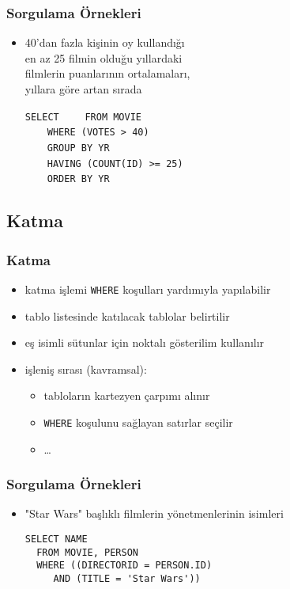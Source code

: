 \documentclass[dvipsnames]{beamer}
\theoremstyle{plain}
\begin{document}
\begin{frame}[fragile]
  \frametitle{Sorgulama Örnekleri}

  \begin{itemize}
    \item 40'dan fazla kişinin oy kullandığı\\
                en az 25 filmin olduğu yıllardaki\\
                filmlerin puanlarının ortalamaları,\\
                yıllara göre artan sırada

\medskip
\lstinline!SELECT! 
~~~~\lstinline!FROM MOVIE!\\
\pause
~~~~\lstinline!WHERE (VOTES > 40)!\\
\pause
~~~~\lstinline!GROUP BY YR!\\
\pause
~~~~\lstinline!HAVING (COUNT(ID) >= 25)!\\
\pause\pause
~~~~\lstinline!ORDER BY YR!
  \end{itemize}
\end{frame}

\subsection{Katma}

\begin{frame}
  \frametitle{Katma}

  \begin{itemize}
    \item katma işlemi \lstinline!WHERE! koşulları yardımıyla yapılabilir
    \item tablo listesinde katılacak tablolar belirtilir
    \item eş isimli sütunlar için noktalı gösterilim kullanılır

    \pause
    \medskip
    \item işleniş sırası (kavramsal):
    \begin{itemize}
      \item tabloların kartezyen çarpımı alınır
      \item \lstinline!WHERE! koşulunu sağlayan satırlar seçilir
      \item \ldots
    \end{itemize}
  \end{itemize}
\end{frame}

\begin{frame}[fragile]
  \frametitle{Sorgulama Örnekleri}

  \begin{itemize}
    \item "Star Wars" başlıklı filmlerin yönetmenlerinin isimleri
    \begin{lstlisting}
SELECT NAME
  FROM MOVIE, PERSON
  WHERE ((DIRECTORID = PERSON.ID)
     AND (TITLE = 'Star Wars'))
    \end{lstlisting}
  \end{itemize}
\end{frame}
\end{document}

